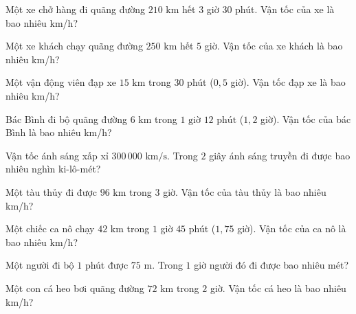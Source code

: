 \begin{ex}
  Một xe chở hàng đi quãng đường $210\text{ km}$ hết $3$ giờ $30$ phút. Vận tốc của xe là bao nhiêu km/h?
\end{ex}

\begin{ex}
  Một xe khách chạy quãng đường $250\text{ km}$ hết $5$ giờ. Vận tốc của xe khách là bao nhiêu km/h?
\end{ex}

\begin{ex}
  Một vận động viên đạp xe $15\text{ km}$ trong $30$ phút ($0{,}5$ giờ). Vận tốc đạp xe là bao nhiêu km/h?
\end{ex}

\begin{ex}
  Bác Bình đi bộ quãng đường $6\text{ km}$ trong $1\text{ giờ } 12\text{ phút}$ ($1{,}2$ giờ). Vận tốc của bác Bình là bao nhiêu km/h?
\end{ex}

\begin{ex}
  Vận tốc ánh sáng xấp xỉ $300\,000\text{ km/s}$. Trong $2$ giây ánh sáng truyền đi được bao nhiêu nghìn ki-lô-mét?
\end{ex}

\begin{ex}
  Một tàu thủy đi được $96\text{ km}$ trong $3$ giờ. Vận tốc của tàu thủy là bao nhiêu km/h?
\end{ex}

\begin{ex}
  Một chiếc ca nô chạy $42\text{ km}$ trong $1$ giờ $45$ phút ($1{,}75$ giờ). Vận tốc của ca nô là bao nhiêu km/h?
\end{ex}

\begin{ex}
  Một người đi bộ $1$ phút được $75\text{ m}$. Trong $1$ giờ người đó đi được bao nhiêu mét?
\end{ex}

\begin{ex}
  Một con cá heo bơi quãng đường $72\text{ km}$ trong $2$ giờ. Vận tốc cá heo là bao nhiêu km/h?
\end{ex}
